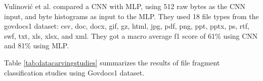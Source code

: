 Vulinović et al. \cite{vulinovic_neural_2019}
compared a CNN with MLP, using 512 raw bytes as the CNN input, and byte histograms as input to the MLP.
They used 18 file types from the govdocs1 dataset: csv, doc, docx, gif, gz, html, jpg, pdf, png, ppt, pptx, ps, rtf, swf, txt, xls, xlsx, and xml.
They got a macro average f1 score of 61\% using CNN and 81\% using MLP.

Table \ref{tab:datacarvingstudies} summarizes 
the results of file fragment classification studies using Govdocs1 dataset.

\begin{table*}[!ht]
\caption{\label{tab:datacarvingstudies}File fragment classification studies using Govdocs1 dataset}
\end{table*}
